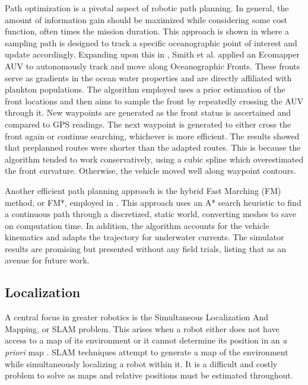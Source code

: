\documentclass[double,12pt]{beavtex}
\begin{document}
Path optimization is a pivotal aspect of robotic path planning. In general, the amount of information gain should be maximized while considering some cost function, often times the mission duration. This approach is shown in \cite{smithtracking} where a sampling path is designed to track a specific oceanographic point of interest and update accordingly. Expanding upon this in \cite{smithfront}, Smith et al. applied an Ecomapper AUV to autonomously track and move along Oceanographic Fronts. These fronts serve as gradients in the ocean water properties and are directly affiliated with plankton populations. The algorithm employed uses a prior estimation of the front locations and then aims to sample the front by repeatedly crossing the AUV through it. New waypoints are generated as the front status is ascertained and compared to GPS readings. The next waypoint is generated to either cross the front again or continue searching, whichever is more efficient. The results showed that preplanned routes were shorter than the adapted routes. This is because the algorithm tended to work conservatively, using a cubic spline which overestimated the front curvature. Otherwise, the vehicle moved well along waypoint contours.

Another efficient path planning approach is the hybrid Fast Marching (FM) method, or FM*, employed in \cite{petres}. This approach uses an A* search heuristic to find a continuous path through a discretized, static world, converting meshes to save on computation time. In addition, the algorithm accounts for the vehicle kinematics and adapts the trajectory for underwater currents. The simulator results are promising but presented without any field trials, listing that as an avenue for future work. 

\subsection{Localization}
A central focus in greater robotics is the Simultaneous Localization And Mapping, or SLAM problem. This arises when a robot either does not have access to a map of its environment or it cannot determine its position in an \textit{a priori} map \cite{prob}. SLAM techniques attempt to generate a map of the environment while simultaneously localizing a robot within it. It is a difficult and costly problem to solve as maps and relative positions must be estimated throughout. 
\end{document}
